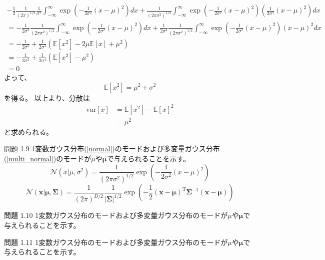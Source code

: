 \documentclass[a4j,dvipdfmx]{jsarticle}
\newcommand{\E}{\mathbb{E}}
\newcommand{\var}{\mathrm{var}}
\begin{document}
\begin{align*}
    -\frac{1}{2}\frac{1}{(2\pi)^{1/2}} \frac{1}{\sigma^3} 
    \int_{-\infty}^{\infty}\exp \left( -\frac{1}{2\sigma^2}(x-\mu)^2 \right) dx
    + \frac{1}{(2\pi \sigma^2)^{1/2}} \int_{-\infty}^{\infty}\exp \left( -\frac{1}{2\sigma^2}(x-\mu)^2 \right)
    \left(\frac{1}{2\sigma^4}(x-\mu)^2 \right) dx \\
    = -\frac{1}{2\sigma^2}\frac{1}{(2\pi \sigma^2)^{1/2}}
    \int_{-\infty}^{\infty}\exp \left( -\frac{1}{2\sigma^2}(x-\mu)^2 \right) dx
    + \frac{1}{2\sigma^4} \frac{1}{(2\pi \sigma^2)^{1/2}} \int_{-\infty}^{\infty}\exp \left( -\frac{1}{2\sigma^2}(x-\mu)^2 \right)
    (x-\mu)^2 dx \\
    = -\frac{1}{2\sigma^2} + \frac{1}{2\sigma^4}(\E[x^2] - 2\mu\E[x] + \mu^2) \\
    = -\frac{1}{2\sigma^2} + \frac{1}{2\sigma^4}(\E[x^2] - \mu^2) \\
    = 0
\end{align*}
よって、
\begin{equation*}
    \E[x^2] = \mu^2 + \sigma^2
\end{equation*}
を得る。
以上より、分散は
\begin{align*}
    \var[x] &= \E[x^2] - \E[x]^2 \\
    &= \mu^2
\end{align*}
と求められる。

\newpage
\begin{itembox}[l]{問題 1.9}
    1変数ガウス分布(\ref{normal})のモードおよび多変量ガウス分布(\ref{multi_normal})のモードが$\mu$や$\bm{\mu}$で与えられることを示す。
    \begin{equation}\label{normal}
        \mathcal{N}(x|\mu, \sigma^2) = 
        \frac{1}{(2\pi \sigma^2)^{1/2}}\exp \left( -\frac{1}{2\sigma^2}(x-\mu)^2 \right)
    \end{equation}
    \begin{equation}\label{multi_normal}
        \mathcal{N}(\bm{x}|\bm{\mu}, \bm{\Sigma}) = \frac{1}{(2\pi)^{D/2}} \frac{1}{|\bm{\Sigma}|^{1/2}}
        \exp \left( -\frac{1}{2} (\bm{x} - \bm{\mu}) ^ {\mathrm{T}}
        \bm{\Sigma}^{-1} (\bm{x} - \bm{\mu}) \right)
    \end{equation}
\end{itembox}

\newpage
\begin{itembox}[l]{問題 1.10}
    1変数ガウス分布のモードおよび多変量ガウス分布のモードが$\mu$や$\bm{\mu}$で与えられることを示す。
\end{itembox}

\newpage
\begin{itembox}[l]{問題 1.11}
    1変数ガウス分布のモードおよび多変量ガウス分布のモードが$\mu$や$\bm{\mu}$で与えられることを示す。
\end{itembox}
\end{document}
